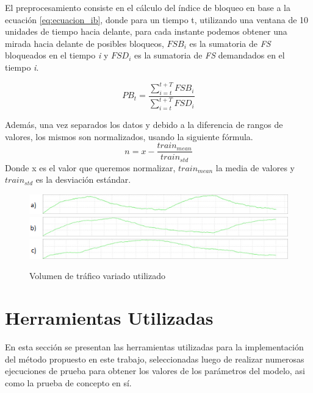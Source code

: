 El preprocesamiento consiste en el cálculo del índice de bloqueo en base a la ecuación \ref{eq:ecuacion_ib}, donde para un tiempo t, utilizando una ventana de 10 unidades de tiempo hacia delante, para cada instante podemos obtener una mirada hacia delante de posibles bloqueos, \(FSB_{i}\) es la sumatoria de \textit{FS} bloqueados en el tiempo \textit{i} y \(FSD_{i}\) es la sumatoria de \textit{FS} demandados en el tiempo \textit{i}.

\begin{equation} \label{eq:ecuacion_ib}
        PB_{t} = \frac{\sum_{i=t}^{t+T}FSB_{i}}{\sum_{i=t}^{t+T}FSD_{i}}
\end{equation}

Además, una vez separados los datos y debido a la diferencia de rangos de valores, los mismos son normalizados, usando la siguiente fórmula.
\begin{equation}
    n = x - \frac{train_{mean}}{train_{std}}
\end{equation}
Donde x es el valor que queremos normalizar, \(train_{mean}\) la media de valores y \(train_{std}\) es la desviación estándar. 

\begin{figure}
    \centering
    \includegraphics[width=1\textwidth]{capitulos/img/trafico_1_a.png}
    \includegraphics[width=1\textwidth]{capitulos/img/trafico_2_b.png}
    \includegraphics[width=1\textwidth]{capitulos/img/trafico_3_c.png}
    \caption{Volumen de tráfico variado utilizado}
    \label{fig:traficos}
\end{figure}

\section{Herramientas Utilizadas}

En esta sección se presentan las herramientas utilizadas para la implementación del método propuesto en este trabajo, seleccionadas luego de realizar numerosas ejecuciones de prueba para obtener los valores de los parámetros del modelo, asi como la prueba de concepto en sí.

